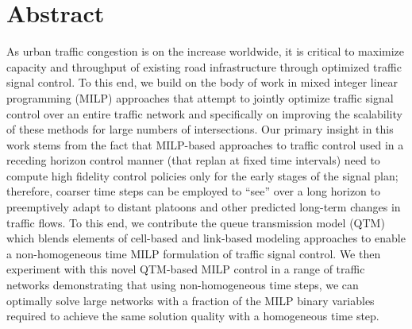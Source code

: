 \section*{Abstract}



As urban traffic congestion is on the increase worldwide, it is
critical to maximize capacity and throughput of existing road
infrastructure through optimized traffic signal control.  To this end,
we build on the body of work in mixed integer linear programming
(MILP) approaches that attempt to jointly optimize traffic signal
control over an entire traffic network and specifically on
improving the scalability of these methods for large numbers of
intersections.  Our primary insight in this work stems from the fact
that MILP-based approaches to traffic control used in a receding
horizon control manner (that replan at fixed time intervals) need to
compute high fidelity control policies only for the early stages of
the signal plan; therefore, coarser time steps can be employed to
``see'' over a long horizon to preemptively adapt to distant platoons
and other predicted long-term changes in traffic flows.  To this end,
we contribute the queue transmission model (QTM) which blends elements
of cell-based and link-based modeling approaches to enable a
non-homogeneous time MILP formulation of traffic signal control.
%
We then experiment with this novel QTM-based MILP control in a range
of traffic networks demonstrating that using non-homogeneous time steps, we can
optimally solve large networks with a fraction of the MILP binary
variables required to achieve the same solution quality with a
homogeneous time step.
%
%

%


%
